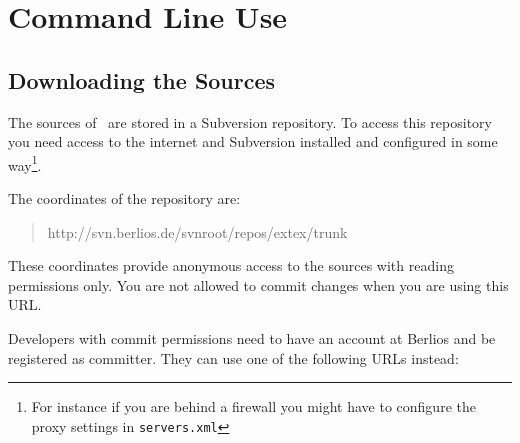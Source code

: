 
\section{Command Line Use}

\subsection{Downloading the Sources}

The sources of \ExTeX\ are stored in a Subversion repository. To
access this repository you need access to the internet and Subversion
installed and configured in some way\footnote{For instance if you are
  behind a firewall you might have to configure the proxy
  settings in \texttt{servers.xml}}.

The coordinates of the repository are:

\begin{quotation}
  http://svn.berlios.de/svnroot/repos/extex/trunk
\end{quotation}

These coordinates provide anonymous access to the sources with reading
permissions only. You are not allowed to commit changes when you are
using this URL.

Developers with commit permissions need to have an account at
Berlios and be registered as committer.
They can use one of the following URLs instead:

